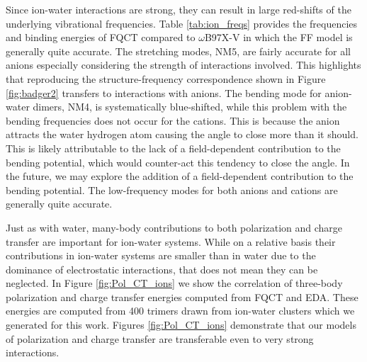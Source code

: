 \documentclass[journal=jctcce,manuscript=article]{achemso}
\begin{document}
Since ion-water interactions are strong, they can result in large red-shifts of the underlying vibrational frequencies. Table \ref{tab:ion_freqs} provides the frequencies and binding energies of FQCT compared to $\omega$B97X-V in which the FF model is generally quite accurate. The  stretching modes, NM5, are fairly accurate for all anions especially considering the strength of interactions involved. This highlights that reproducing the structure-frequency correspondence shown in Figure \ref{fig:badger2} transfers to interactions with anions. The bending mode for anion-water dimers, NM4, is systematically blue-shifted, while this problem with the bending frequencies does not occur for the cations. This is because the anion attracts the water hydrogen atom causing the  angle to close more than it should. This is likely attributable to the lack of a field-dependent contribution to the bending potential, which would counter-act this tendency to close the  angle. In the future, we may explore the addition of a field-dependent contribution to the bending potential.\cite{lacour2023predicting} The low-frequency modes for both anions and cations are generally quite accurate.

Just as with water, many-body contributions to both polarization and charge transfer are important for ion-water systems. While on a relative basis their contributions in ion-water systems are smaller than in water due to the dominance of electrostatic interactions, that does not mean they can be neglected. In Figure \ref{fig:Pol_CT_ions} we show the correlation of three-body polarization and charge transfer energies computed from FQCT and EDA. These energies are computed from 400 trimers drawn from ion-water clusters which we generated for this work. Figures \ref{fig:Pol_CT_ions} demonstrate that our models of polarization and charge transfer are transferable even to very strong interactions.
\end{document}
